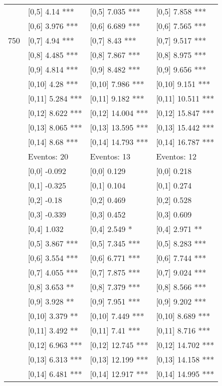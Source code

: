 \begin{table}
\begin{tabular}[t]{llll}
 & {}[0,5] 4.14 *** & {}[0,5] 7.035 *** & {}[0,5] 7.858 ***\\
 & {}[0,6] 3.976 *** & {}[0,6] 6.689 *** & {}[0,6] 7.565 ***\\
750 & {}[0,7] 4.94 *** & {}[0,7] 8.43 *** & {}[0,7] 9.517 ***\\
\addlinespace
 & {}[0,8] 4.485 *** & {}[0,8] 7.867 *** & {}[0,8] 8.975 ***\\
 & {}[0,9] 4.814 *** & {}[0,9] 8.482 *** & {}[0,9] 9.656 ***\\
 & {}[0,10] 4.28 *** & {}[0,10] 7.986 *** & {}[0,10] 9.151 ***\\
 & {}[0,11] 5.284 *** & {}[0,11] 9.182 *** & {}[0,11] 10.511 ***\\
 & {}[0,12] 8.622 *** & {}[0,12] 14.004 *** & {}[0,12] 15.847 ***\\
\addlinespace
 & {}[0,13] 8.065 *** & {}[0,13] 13.595 *** & {}[0,13] 15.442 ***\\
 & {}[0,14] 8.68 *** & {}[0,14] 14.793 *** & {}[0,14] 16.787 ***\\
 & Eventos:  20 & Eventos:  13 & Eventos:  12\\
 & {}[0,0] -0.092 & {}[0,0] 0.129 & {}[0,0] 0.218\\
 & {}[0,1] -0.325 & {}[0,1] 0.104 & {}[0,1] 0.274\\
\addlinespace
 & {}[0,2] -0.18 & {}[0,2] 0.469 & {}[0,2] 0.528\\
 & {}[0,3] -0.339 & {}[0,3] 0.452 & {}[0,3] 0.609\\
 & {}[0,4] 1.032 & {}[0,4] 2.549 * & {}[0,4] 2.971 **\\
 & {}[0,5] 3.867 *** & {}[0,5] 7.345 *** & {}[0,5] 8.283 ***\\
 & {}[0,6] 3.554 *** & {}[0,6] 6.771 *** & {}[0,6] 7.744 ***\\
\addlinespace
1000 & {}[0,7] 4.055 *** & {}[0,7] 7.875 *** & {}[0,7] 9.024 ***\\
 & {}[0,8] 3.653 ** & {}[0,8] 7.379 *** & {}[0,8] 8.566 ***\\
 & {}[0,9] 3.928 ** & {}[0,9] 7.951 *** & {}[0,9] 9.202 ***\\
 & {}[0,10] 3.379 ** & {}[0,10] 7.449 *** & {}[0,10] 8.689 ***\\
 & {}[0,11] 3.492 ** & {}[0,11] 7.41 *** & {}[0,11] 8.716 ***\\
\addlinespace
 & {}[0,12] 6.963 *** & {}[0,12] 12.745 *** & {}[0,12] 14.702 ***\\
 & {}[0,13] 6.313 *** & {}[0,13] 12.199 *** & {}[0,13] 14.158 ***\\
 & {}[0,14] 6.481 *** & {}[0,14] 12.917 *** & {}[0,14] 14.995 ***\\
\bottomrule
\end{tabular}
\end{table}
